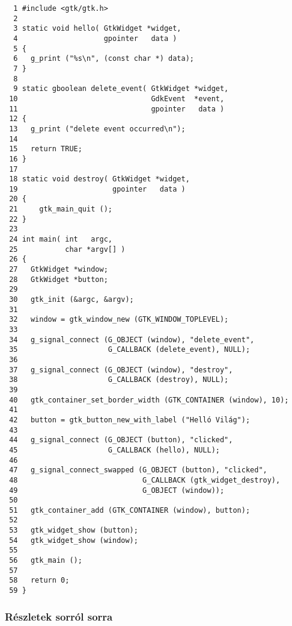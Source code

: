 \vspace{16pt}
\fontsize{6pt}{6pt}
\begin{verbatim}
  1 #include <gtk/gtk.h>
  2
  3 static void hello( GtkWidget *widget,
  4                    gpointer   data )
  5 {
  6   g_print ("%s\n", (const char *) data);
  7 }
  8
  9 static gboolean delete_event( GtkWidget *widget,
 10                               GdkEvent  *event,
 11                               gpointer   data )
 12 {
 13   g_print ("delete event occurred\n");
 14
 15   return TRUE;
 16 }
 17
 18 static void destroy( GtkWidget *widget,
 19                      gpointer   data )
 20 {
 21     gtk_main_quit ();
 22 }
 23
 24 int main( int   argc,
 25           char *argv[] )
 26 {
 27   GtkWidget *window;
 28   GtkWidget *button;
 29
 30   gtk_init (&argc, &argv);
 31
 32   window = gtk_window_new (GTK_WINDOW_TOPLEVEL);
 33
 34   g_signal_connect (G_OBJECT (window), "delete_event",
 35                     G_CALLBACK (delete_event), NULL);
 36
 37   g_signal_connect (G_OBJECT (window), "destroy",
 38                     G_CALLBACK (destroy), NULL);
 39
 40   gtk_container_set_border_width (GTK_CONTAINER (window), 10);
 41
 42   button = gtk_button_new_with_label ("Helló Világ");
 43
 44   g_signal_connect (G_OBJECT (button), "clicked",
 45                     G_CALLBACK (hello), NULL);
 46
 47   g_signal_connect_swapped (G_OBJECT (button), "clicked",
 48                             G_CALLBACK (gtk_widget_destroy),
 49                             G_OBJECT (window));
 50
 51   gtk_container_add (GTK_CONTAINER (window), button);
 52
 53   gtk_widget_show (button);
 54   gtk_widget_show (window);
 55
 56   gtk_main ();
 57
 58   return 0;
 59 }
\end{verbatim} 

\subsubsection{Részletek sorról sorra}

